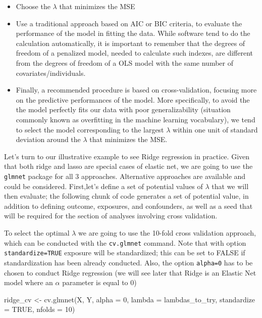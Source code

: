 \documentclass[
]{book}
\newenvironment{Shaded}{\begin{snugshade}}{\end{snugshade}}
\newcommand{\AttributeTok}[1]{\textcolor[rgb]{0.77,0.63,0.00}{#1}}
\newcommand{\ConstantTok}[1]{\textcolor[rgb]{0.00,0.00,0.00}{#1}}
\newcommand{\DecValTok}[1]{\textcolor[rgb]{0.00,0.00,0.81}{#1}}
\newcommand{\FunctionTok}[1]{\textcolor[rgb]{0.00,0.00,0.00}{#1}}
\newcommand{\NormalTok}[1]{#1}
\newcommand{\OtherTok}[1]{\textcolor[rgb]{0.56,0.35,0.01}{#1}}
\providecommand{\tightlist}{%
  \setlength{\itemsep}{0pt}\setlength{\parskip}{0pt}}
\begin{document}
\begin{itemize}
\tightlist
\item
  Choose the \(\lambda\) that minimizes the MSE
\item
  Use a traditional approach based on AIC or BIC criteria, to evaluate the performance of the model in fitting the data. While software tend to do the calculation automatically, it is important to remember that the degrees of freedom of a penalized model, needed to calculate such indexes, are different from the degrees of freedom of a OLS model with the same number of covariates/individuals.
\item
  Finally, a recommended procedure is based on cross-validation, focusing more on the predictive performances of the model. More specifically, to avoid the the model perfectly fits our data with poor generalizability (situation commonly known as overfitting in the machine learning vocabulary), we tend to select the model corresponding to the largest \(\lambda\) within one unit of standard deviation around the \(\lambda\) that minimizes the MSE.
\end{itemize}

Let's turn to our illustrative example to see Ridge regression in practice. Given that both ridge and lasso are special cases of elastic net, we are going to use the \texttt{glmnet} package for all 3 approaches. Alternative approaches are available and could be considered. First,let's define a set of potential values of \(\lambda\) that we will then evaluate; the following chunk of code generates a set of potential value, in addition to defining outcome, exposures, and confounders, as well as a seed that will be required for the section of analyses involving cross validation.

To select the optimal \(\lambda\) we are going to use the 10-fold cross validation approach, which can be conducted with the \texttt{cv.glmnet} command. Note that with option \texttt{standardize=TRUE} exposure will be standardized; this can be set to FALSE if standardization has been already conducted. Also, the option \texttt{alpha=0} has to be chosen to conduct Ridge regression (we will see later that Ridge is an Elastic Net model where an \(\alpha\) parameter is equal to 0)

\begin{Shaded}
\begin{Highlighting}[]
\NormalTok{ridge\_cv }\OtherTok{\textless{}{-}} \FunctionTok{cv.glmnet}\NormalTok{(X, Y, }\AttributeTok{alpha =} \DecValTok{0}\NormalTok{, }\AttributeTok{lambda =}\NormalTok{ lambdas\_to\_try,}
                      \AttributeTok{standardize =} \ConstantTok{TRUE}\NormalTok{, }\AttributeTok{nfolds =} \DecValTok{10}\NormalTok{)}
\end{Highlighting}
\end{Shaded}
\end{document}
